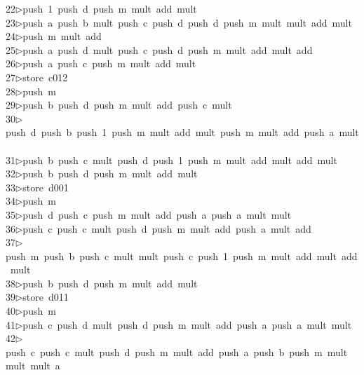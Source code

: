 \begin{tabbing}
22\>$\triangleright$\>push\ 1\ push\ d\ push\ m\ mult\ add\ mult\ \\[0pt]
23\>$\triangleright$\>push\ a\ push\ b\ mult\ push\ c\ push\ d\ push\ d\ push\ m\ mult\ mult\ add\ mult\ \\[0pt]
24\>$\triangleright$\>push\ m\ mult\ add\ \\[0pt]
25\>$\triangleright$\>push\ a\ push\ d\ mult\ push\ c\ push\ d\ push\ m\ mult\ add\ mult\ add\ \\[0pt]
26\>$\triangleright$\>push\ a\ push\ c\ push\ m\ mult\ add\ mult\ \\[0pt]
27\>$\triangleright$\>store\ c012\ \\[0pt]
28\>$\triangleright$\>push\ m\ \\[0pt]
29\>$\triangleright$\>push\ b\ push\ d\ push\ m\ mult\ add\ push\ c\ mult\ \\[0pt]
30\>$\triangleright$\>push\ d\ push\ b\ push\ 1\ push\ m\ mult\ add\ mult\ push\ m\ mult\ add\ push\ a\ mult\ \\[0pt]
31\>$\triangleright$\>push\ b\ push\ c\ mult\ push\ d\ push\ 1\ push\ m\ mult\ add\ mult\ add\ mult\ \\[0pt]
32\>$\triangleright$\>push\ b\ push\ d\ push\ m\ mult\ add\ mult\ \\[0pt]
33\>$\triangleright$\>store\ d001\ \\[0pt]
34\>$\triangleright$\>push\ m\ \\[0pt]
35\>$\triangleright$\>push\ d\ push\ c\ push\ m\ mult\ add\ push\ a\ push\ a\ mult\ mult\ \\[0pt]
36\>$\triangleright$\>push\ c\ push\ c\ mult\ push\ d\ push\ m\ mult\ add\ push\ a\ mult\ add\ \\[0pt]
37\>$\triangleright$\>push\ m\ push\ b\ push\ c\ mult\ mult\ push\ c\ push\ 1\ push\ m\ mult\ add\ mult\ add\ mult\ \\[0pt]
38\>$\triangleright$\>push\ b\ push\ d\ push\ m\ mult\ add\ mult\ \\[0pt]
39\>$\triangleright$\>store\ d011\ \\[0pt]
40\>$\triangleright$\>push\ m\ \\[0pt]
41\>$\triangleright$\>push\ c\ push\ d\ mult\ push\ d\ push\ m\ mult\ add\ push\ a\ push\ a\ mult\ mult\ \\[0pt]
42\>$\triangleright$\>push\ c\ push\ c\ mult\ push\ d\ push\ m\ mult\ add\ push\ a\ push\ b\ push\ m\ mult\ mult\ mult\ a\\[0pt]

\end{tabbing}
